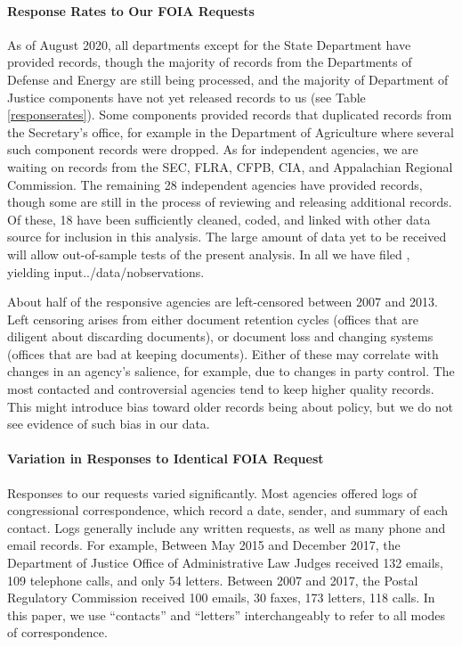 \paragraph{Response Rates to Our FOIA Requests}
As of August 2020, all departments except for the State Department have provided records, though the majority of records from the Departments of Defense and Energy are still being processed, and the majority of Department of Justice components have not yet released records to us (see Table \ref{responserates}). 
Some components provided records that duplicated records from the Secretary's office, for example in the Department of Agriculture where several such component records were dropped. As for independent agencies, we are waiting on records from the SEC, FLRA, CFPB, CIA, and Appalachian Regional Commission. 
The remaining 28 independent agencies have provided records, though some are still in the process of reviewing and releasing additional records. 
Of these, 18 have been sufficiently cleaned, coded, and linked with other data source for inclusion in this analysis. 
The large amount of data yet to be received will allow out-of-sample tests of the present analysis. In all we have filed \unskip, yielding input{../data/n}\unskip observations.

About half of the responsive agencies are left-censored between 2007 and 2013. 
Left censoring arises from either document retention cycles (offices that are diligent about discarding documents), or document loss and changing systems (offices that are bad at keeping documents). 
Either of these may correlate with changes in an agency's salience, for example, due to changes in party control.
The most contacted and controversial agencies tend to keep higher quality records.
This might introduce bias toward older records being about policy, but we do not see evidence of such bias in our data. 

 \paragraph{Variation in Responses to Identical FOIA Request} 
 Responses to our requests varied significantly. 
 Most agencies offered logs of congressional correspondence, which record a date, sender, and summary of each contact. Logs generally include any written requests, as well as many phone and email records. 
For example, Between May 2015 and December 2017, the Department of Justice Office of Administrative Law Judges received 132 emails, 109 telephone calls, and only 54 letters. 
Between 2007 and 2017, the Postal Regulatory Commission received 100 emails, 30 faxes, 173 letters, 118 calls. In this paper, we use ``contacts'' and ``letters'' interchangeably to refer to all modes of correspondence. \

